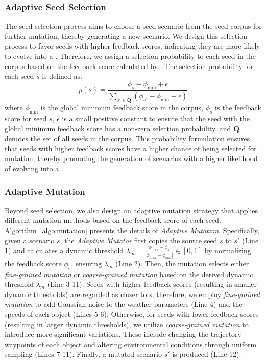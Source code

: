 \subsubsection{Adaptive Seed Selection} The seed selection process aims to choose a seed scenario from the seed corpus for further mutation, thereby generating a new scenario.
We design this selection process to favor seeds with higher feedback scores, indicating they are more likely to evolve into a {\mccs}.
Therefore, we assign a selection probability to each seed in the corpus based on the feedback score calculated by \feedback. The selection probability for each seed \( s \) is defined as:
\begin{equation}
    p(s) = \frac{\phi_{s} - \phi_{\min} + \epsilon}{\sum_{s' \in \mathbf{Q}} (\phi_{s'} - \phi_{\min} + \epsilon)}
\end{equation}
where \( \phi_{\min} \) is the global minimum feedback score in the corpus, \( \phi_{s} \) is the feedback score for seed \( s \), \( \epsilon \) is a small positive constant to ensure that the seed with the global minimum feedback score has a non-zero selection probability, and \( \mathbf{Q} \) denotes the set of all seeds in the corpus. This probability formulation ensures that seeds with higher feedback scores have a higher chance of being selected for mutation, thereby promoting the generation of scenarios with a higher likelihood of evolving into a {\mccs}.


\subsubsection{Adaptive Mutation} Beyond seed selection, we also design an adaptive mutation strategy that applies different mutation methods based on the feedback score of each seed. 
Algorithm~\ref{algo:mutation} presents the details of \textit{Adaptive Mutation}. 
Specifically, given a scenario \( s \), the \textit{Adaptive Mutator} first copies the source seed \( s \) to \( s' \) (Line 1) and calculates a dynamic threshold \( \lambda_m = \frac{\phi_{\text{max}} - \phi_s}{|\phi_{\text{max}} - \phi_{\text{min}}|} \in [0, 1] \) by normalizing the feedback score \( \phi_s \), ensuring \( \lambda_m \) (Line 2).
Then, the mutation selects either \textit{fine-grained mutation} or \textit{coarse-grained mutation} based on the derived dynamic threshold $\lambda_m$ (Line 3-11). Seeds with higher feedback scores (resulting in smaller dynamic thresholds) are regarded as closer to {\mccs}s; therefore, we employ \textit{fine-grained mutation} to add Gaussian noise to the weather parameters (Line 4) and the speeds of each object (Lines 5-6). Otherwise, for seeds with lower feedback scores (resulting in larger dynamic thresholds), we utilize \textit{coarse-grained mutation} to introduce more significant variations. These include changing the trajectory waypoints of each object and altering environmental conditions through uniform sampling (Lines 7-11).
Finally, a mutated scenario \( s' \) is produced (Line 12).

